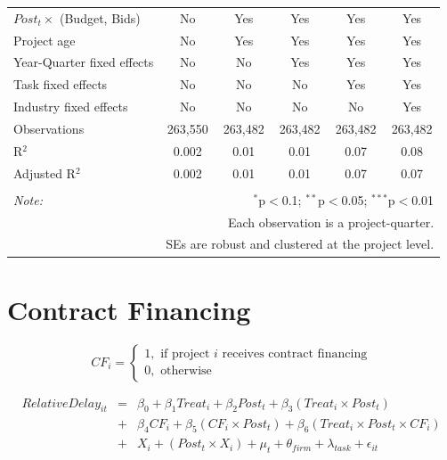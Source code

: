 \documentclass[
]{article}
\begin{document}
\begin{table}[H]
\begin{tabular}{@{\extracolsep{-2pt}}lccccc}
$Post_t \times$  (Budget, Bids) & No & Yes & Yes & Yes & Yes \\ 
Project age & No & Yes & Yes & Yes & Yes \\ 
Year-Quarter fixed effects & No & No & Yes & Yes & Yes \\ 
Task fixed effects & No & No & No & Yes & Yes \\ 
Industry fixed effects & No & No & No & No & Yes \\ 
Observations & 263,550 & 263,482 & 263,482 & 263,482 & 263,482 \\ 
R$^{2}$ & 0.002 & 0.01 & 0.01 & 0.07 & 0.08 \\ 
Adjusted R$^{2}$ & 0.002 & 0.01 & 0.01 & 0.07 & 0.07 \\ 
\hline 
\hline \\[-1.8ex] 
\textit{Note:}  & \multicolumn{5}{r}{$^{*}$p$<$0.1; $^{**}$p$<$0.05; $^{***}$p$<$0.01} \\ 
 & \multicolumn{5}{r}{Each observation is a project-quarter.} \\ 
 & \multicolumn{5}{r}{SEs are robust and clustered at the project level.} \\ 
\end{tabular} 
\end{table}

\hypertarget{contract-financing}{%
\section{Contract Financing}\label{contract-financing}}

\[ CF_i = \begin{cases} 1, \text{ if project } i \text{ receives contract financing}\\
0, \text{ otherwise} \end{cases}\]

\[ \begin{aligned}
RelativeDelay_{it} &=& \beta_0+\beta_1 Treat_i + \beta_2 Post_t + \beta_3 (Treat_i \times Post_t) \\
&+&\beta_4 CF_i + \beta_5 (CF_i \times Post_t) + \beta_6 (Treat_i \times Post_t \times CF_i) \\ 
&+&X_i + (Post_t \times X_i) + \mu_t + \theta_{firm} + \lambda_{task}+ \epsilon_{it}
\end{aligned}\]
\end{document}
